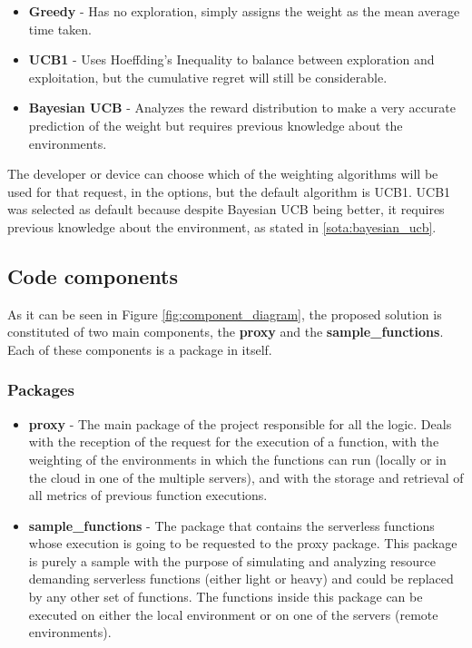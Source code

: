\begin{itemize}
    \item \textbf{Greedy} - Has no exploration, simply assigns the weight as the
        mean average time taken.
    \item \textbf{UCB1} - Uses Hoeffding's Inequality to balance between
        exploration and exploitation, but the cumulative regret will still be considerable.
    \item \textbf{Bayesian UCB} - Analyzes the reward distribution to make a very
        accurate prediction of the weight but requires previous knowledge about the environments.
\end{itemize}

The developer or device can choose which of the weighting algorithms will be used
for that request, in the options, but the default algorithm is UCB1. UCB1 was
selected as default because despite Bayesian UCB being better, it requires
previous knowledge about the environment, as stated in \ref{sota:bayesian_ucb}.

\subsection{Code components}

As it can be seen in Figure \ref{fig:component_diagram}, the proposed solution is
constituted of two main components, the \textbf{proxy} and the
\textbf{sample\_functions}. Each of these components is a package in itself.

\subsubsection{Packages}

\begin{itemize}
    \item \textbf{proxy} - The main package of the project responsible for
        all the logic. Deals with the reception of the request for the execution
        of a function, with the weighting of the environments in which the
        functions can run (locally or in the cloud in one of the multiple
        servers), and with the storage and retrieval of all metrics of previous
        function executions. 
    \item \textbf{sample\_functions} - The package that contains the serverless functions
        whose execution is going to be requested to the proxy package. This package is purely a sample with the purpose of simulating and analyzing resource demanding serverless functions (either light or heavy) and could be replaced by any other set of functions. The functions inside this package can be executed on either the local environment or on one of the servers (remote environments).
\end{itemize}

